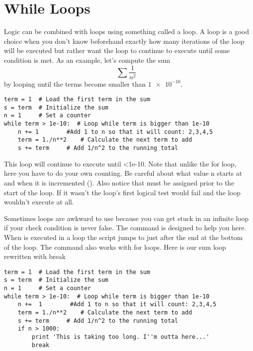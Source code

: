 \section{While Loops}
Logic can be combined with loops using something called a
 loop.  A  loop is a good choice when you
don't know beforehand exactly how many iterations of the loop will be
executed but rather want the loop to continue to execute until some
condition is met.  As an example, let's compute the sum
\begin{equation}
\sum \frac{1}{n^2}
\end{equation}
by looping until the terms become smaller than $\num{1e-10}$.
\begin{Verbatim}
term = 1  # Load the first term in the sum
s = term  # Initialize the sum
n = 1     # Set a counter
while term > 1e-10:  # Loop while term is bigger than 1e-10
    n += 1        #Add 1 to n so that it will count: 2,3,4,5
    term = 1./n**2    # Calculate the next term to add
    s += term     # Add 1/n^2 to the running total
\end{Verbatim}
This loop will continue to execute until <1e-10. Note
that unlike the for loop, here you have to do your own counting. Be
careful about what value n starts at and when it is incremented
(). Also notice that  must be assigned
prior to the start of the loop.  If it wasn't the loop's first logical
test would fail and the loop wouldn't execute at all.

Sometimes  loops are awkward to use because you can get
stuck in an infinite loop if your check condition is never false. The
 command is designed to help you here. When
 is executed in a loop the script jumps to just after
the end at the bottom of the loop. The  command also
works with for loops. Here is our sum loop rewritten with break
\begin{Verbatim}
term = 1  # Load the first term in the sum
s = term  # Initialize the sum
n = 1     # Set a counter
while term > 1e-10:  # Loop while term is bigger than 1e-10
    n +=  1        #Add 1 to n so that it will count: 2,3,4,5
    term = 1./n**2    # Calculate the next term to add
    s += term     # Add 1/n^2 to the running total
    if n > 1000:
        print 'This is taking too long. I''m outta here...'
        break
\end{Verbatim}

